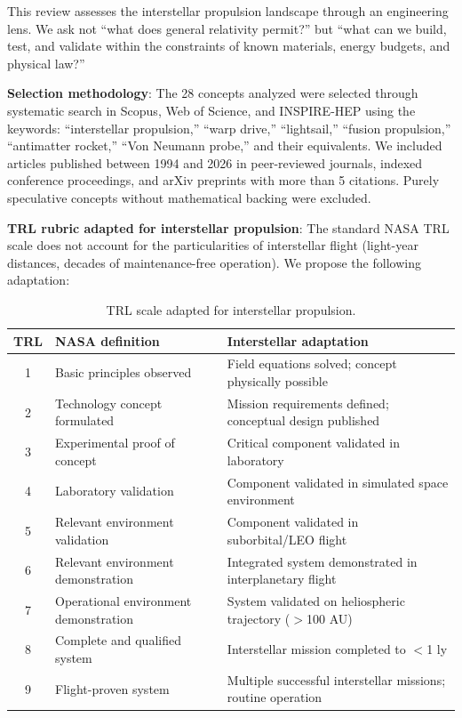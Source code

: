 \documentclass[11pt,a4paper,onecolumn]{article}
\begin{document}
This review assesses the interstellar propulsion landscape through an engineering lens. We ask not ``what does general relativity permit?'' but ``what can we build, test, and validate within the constraints of known materials, energy budgets, and physical law?''

\textbf{Selection methodology}: The 28 concepts analyzed were selected through systematic search in Scopus, Web of Science, and INSPIRE-HEP using the keywords: ``interstellar propulsion,'' ``warp drive,'' ``lightsail,'' ``fusion propulsion,'' ``antimatter rocket,'' ``Von Neumann probe,'' and their equivalents. We included articles published between 1994 and 2026 in peer-reviewed journals, indexed conference proceedings, and arXiv preprints with more than 5 citations. Purely speculative concepts without mathematical backing were excluded.

\textbf{TRL rubric adapted for interstellar propulsion}: The standard NASA TRL scale does not account for the particularities of interstellar flight (light-year distances, decades of maintenance-free operation). We propose the following adaptation:

\begin{table}[h]
\centering
\caption{TRL scale adapted for interstellar propulsion.}
\begin{tabular}{cll}
\hline
TRL & NASA definition & Interstellar adaptation \\
\hline
1 & Basic principles observed & Field equations solved; concept physically possible \\
2 & Technology concept formulated & Mission requirements defined; conceptual design published \\
3 & Experimental proof of concept & Critical component validated in laboratory \\
4 & Laboratory validation & Component validated in simulated space environment \\
5 & Relevant environment validation & Component validated in suborbital/LEO flight \\
6 & Relevant environment demonstration & Integrated system demonstrated in interplanetary flight \\
7 & Operational environment demonstration & System validated on heliospheric trajectory ($>$100 AU) \\
8 & Complete and qualified system & Interstellar mission completed to $<$1 ly \\
9 & Flight-proven system & Multiple successful interstellar missions; routine operation \\
\hline
\end{tabular}
\end{table}
\end{document}
